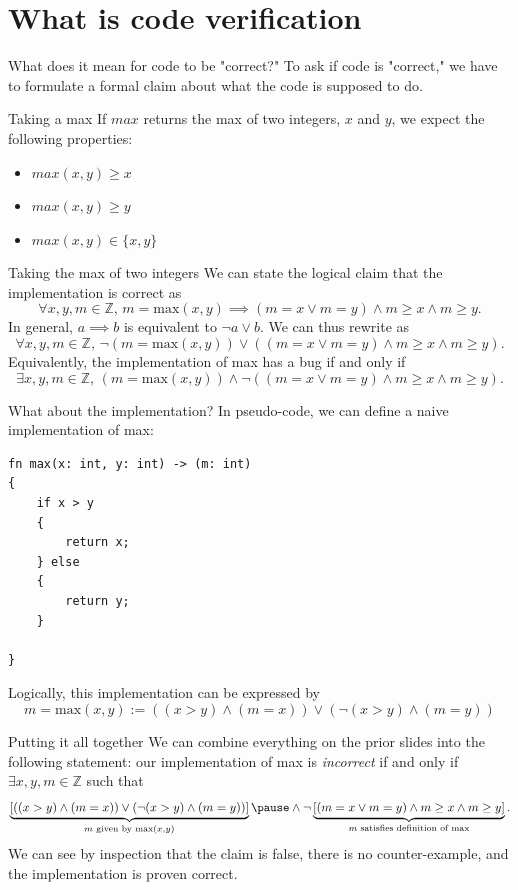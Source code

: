 \section{What is code verification}
\begin{frame}{What does it mean for code to be "correct?"}
    To ask if code is "correct," we have to formulate a formal claim about what the code is supposed to do.
    \begin{block}{Taking a max}
        If $max$ returns the max of two integers, $x$ and $y$, we expect the following properties:
        \begin{itemize}
        \item $max(x,y)\geq x$
        \item $max(x,y)\geq y$
        \item $max(x,y) \in \{x,y\}$ 
        \end{itemize}
    \end{block}
\end{frame}

\begin{frame}{Taking the max of two integers}
    We can state the logical claim that the implementation is correct as 
    $$\forall x,y,m\in\mathbb{Z},\, m=\text{max}(x,y)\implies (m=x \lor m=y) \land m\geq x\land m\geq y.$$
    \pause
    In general, $a\implies b$ is equivalent to $\lnot a \lor b$.
    \medskip
    We can thus rewrite as
    $$\forall x,y,m\in\mathbb{Z},\, \lnot(m=\text{max}(x,y))\lor\left( (m=x \lor m=y) \land m\geq x\land m\geq y\right).$$
    \pause
    Equivalently, the implementation of max has a bug if and only if
    $$\exists x,y,m\in\mathbb{Z},\, (m=\text{max}(x,y))\land \lnot\left( (m=x \lor m=y) \land m\geq x\land m\geq y\right).$$
\end{frame}

\begin{frame}[fragile]{What about the implementation?}
    In pseudo-code, we can define a naive implementation of max:
\begin{lstlisting}[basicstyle=\ttfamily\footnotesize]
fn max(x: int, y: int) -> (m: int)
{
    if x > y
    {
        return x;
    } else
    {
        return y;
    }

}
\end{lstlisting}
Logically, this implementation can be expressed by
\[
m=\text{max}(x,y):= ((x>y)\land (m=x))\lor(\lnot(x>y)\land (m=y))
\]
\end{frame}

\begin{frame}{Putting it all together}
    We can combine everything on the prior slides into the following statement: our implementation of max is \emph{incorrect}
    if and only if $\exists x,y,m\in\mathbb{Z}$ such that
\[
\underbrace{\left[((x>y)\land (m=x))\lor(\lnot(x>y)\land (m=y))\right] }_{m\text{ given by max}(x,y)}
\pause
\land \lnot\underbrace{\left[ (m=x \lor m=y) \land m\geq x\land m\geq y\right]}_{m\text{ satisfies definition of max}}.
\]
\pause
We can see by inspection that the claim is false, there is no counter-example, and the implementation is proven correct.
\end{frame}
